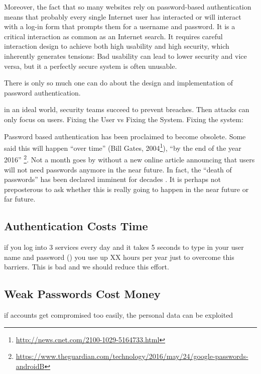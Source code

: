 Moreover, the fact that so many websites rely on password-based authentication means that probably every single Internet user has interacted or will interact with a log-in form that prompts them for a username and password. It is a critical interaction as common as an Internet search. It requires careful interaction design to achieve both high usability and high security, which inherently generates tensions: Bad usability can lead to lower security and vice versa, but it a perfectly secure system is often unusable. 



There is only so much one can do about the design and implementation of password authentication. 

in an ideal world, security teams succeed to prevent breaches. Then attacks can only focus on users. 
Fixing the User vs Fixing the System. Fixing the system: \cite{Schmidt2013Pitfalls}

Password based authentication has been proclaimed to become obsolete. Some said this will happen ``over time'' (Bill Gates, 2004\footnote{\url{http://news.cnet.com/2100-1029-5164733.html}}), ``by the end of the year 2016'' \footnote{\url{https://www.theguardian.com/technology/2016/may/24/google-passwords-androidB}}. Not a month goes by without a new online article announcing that users will not need passwords anymore in the near future. In fact, the ``death of passwords'' has been declared imminent for decades \cite{Herley2012PersistenceOfPasswords, Bonneau2012ReplacePasswords}. It is perhaps not preposterous to ask whether this is really going to happen in the near future or far future. 


\subsection{Authentication Costs Time}
if you log into 3 services every day and it takes 5 seconds to type in your user name and password (\ar) you use up XX hours per year just to overcome this barriers. This is bad and we should reduce this effort. 


\subsection{Weak Passwords Cost Money}
if accounts get compromised too easily, the personal data can be exploited 

